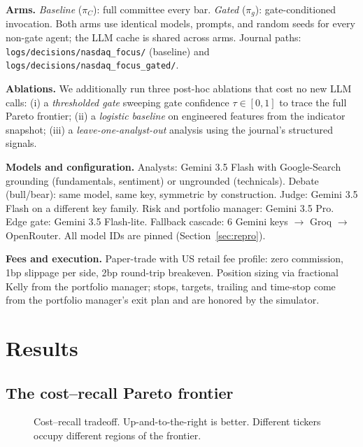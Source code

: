 \documentclass[conference]{IEEEtran}
\begin{document}
\textbf{Arms.}
\emph{Baseline} ($\pi_C$): full committee every bar.
\emph{Gated} ($\pi_g$): gate-conditioned invocation. Both arms use
identical models, prompts, and random seeds for every non-gate
agent; the LLM cache is shared across arms. Journal paths:
\verb|logs/decisions/nasdaq_focus/| (baseline) and
\verb|logs/decisions/nasdaq_focus_gated/|.

\textbf{Ablations.}
We additionally run three post-hoc ablations that cost no new LLM
calls: (i) a \emph{thresholded gate} sweeping gate confidence
$\tau\in[0,1]$ to trace the full Pareto frontier;
(ii) a \emph{logistic baseline} on engineered features from the
indicator snapshot; (iii) a \emph{leave-one-analyst-out} analysis
using the journal's structured signals.

\textbf{Models and configuration.}
Analysts: Gemini 3.5 Flash with Google-Search grounding
(fundamentals, sentiment) or ungrounded (technicals). Debate
(bull/bear): same model, same key, symmetric by construction.
Judge: Gemini 3.5 Flash on a different key family. Risk and
portfolio manager: Gemini 3.5 Pro. Edge gate: Gemini 3.5 Flash-lite.
Fallback cascade: 6 Gemini keys $\to$ Groq $\to$ OpenRouter. All
model IDs are pinned (Section~\ref{sec:repro}).

\textbf{Fees and execution.}
Paper-trade with US retail fee profile: zero commission, 1bp
slippage per side, 2bp round-trip breakeven. Position sizing via
fractional Kelly from the portfolio manager; stops, targets,
trailing and time-stop come from the portfolio manager's exit plan
and are honored by the simulator.

\section{Results}

\subsection{The cost--recall Pareto frontier}
\label{sec:results-pareto}

\begin{figure}[t]
  \centering
  \caption{Cost--recall tradeoff. Up-and-to-the-right is better.
  Different tickers occupy different regions of the frontier.}
  \label{fig:pareto}
\end{figure}
\end{document}
